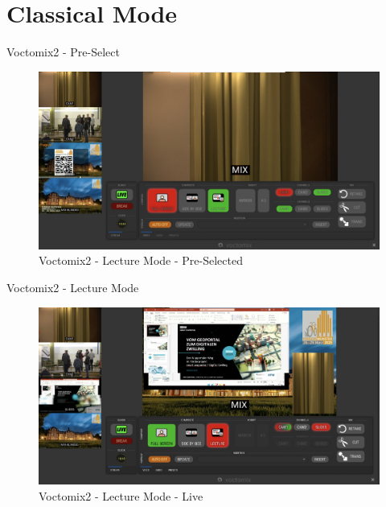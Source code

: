 \section{Classical Mode}
\begin{frame}{Voctomix2 - Pre-Select}
	\begin{figure}
		\centering
		\includegraphics[width=.9\textwidth]{images/voctomix2-lecture_select.jpg}
		\caption{Voctomix2 - Lecture Mode - Pre-Selected}
	\end{figure}
\end{frame}

\begin{frame}{Voctomix2 - Lecture Mode}
	\begin{figure}
		\centering
		\includegraphics[width=.9\textwidth]{images/voctomix2-lecture.jpg}
		\caption{Voctomix2 - Lecture Mode - Live}
	\end{figure}
\end{frame}

